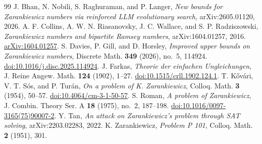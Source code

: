 \documentclass[10pt,a4paper]{amsart}
\begin{document}
\begin{thebibliography}{99}
 J. Bhan, N. Nobili, S. Raghuraman, and P. Langer, \emph{New bounds for Zarankiewicz numbers via reinforced LLM evolutionary search}, arXiv:2605.01120, 2026.
 A. F. Collins, A. W. N. Riasanovsky, J. C. Wallace, and S. P. Radziszowski, \emph{Zarankiewicz numbers and bipartite Ramsey numbers}, arXiv:1604.01257, 2016. \href{https://arxiv.org/abs/1604.01257}{arXiv:1604.01257}.
 S. Davies, P. Gill, and D. Horsley, \emph{Improved upper bounds on Zarankiewicz numbers}, Discrete Math. \textbf{349} (2026), no.~5, 114924. \href{https://doi.org/10.1016/j.disc.2025.114924}{doi:10.1016/j.disc.2025.114924}.
 J. Farkas, \emph{Theorie der einfachen Ungleichungen}, J. Reine Angew. Math. \textbf{124} (1902), 1--27. \href{https://doi.org/10.1515/crll.1902.124.1}{doi:10.1515/crll.1902.124.1}.
 T. K\H{o}v\'ari, V. T. S\'os, and P. Tur\'an, \emph{On a problem of K. Zarankiewicz}, Colloq. Math. \textbf{3} (1954), 50--57. \href{https://doi.org/10.4064/cm-3-1-50-57}{doi:10.4064/cm-3-1-50-57}.
 S. Roman, \emph{A problem of Zarankiewicz}, J. Combin. Theory Ser. A \textbf{18} (1975), no.~2, 187--198. \href{https://doi.org/10.1016/0097-3165(75)90007-2}{doi:10.1016/0097-3165(75)90007-2}.
 Y. Tan, \emph{An attack on Zarankiewicz's problem through SAT solving}, arXiv:2203.02283, 2022.
 K. Zarankiewicz, \emph{Problem P 101}, Colloq. Math. \textbf{2} (1951), 301.
\end{thebibliography}
\end{document}
